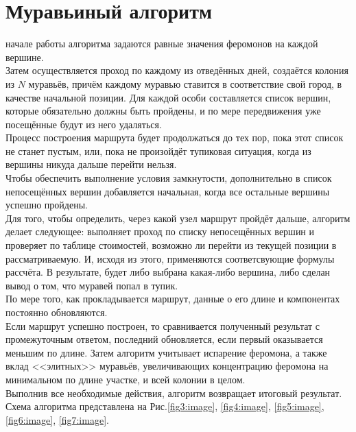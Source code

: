 \section{Муравьиный алгоритм}
 начале работы алгоритма задаются равные значения феромонов на каждой вершине.\\

Затем осуществляется проход по каждому из отведённых дней, создаётся колония из $N$ муравьёв, причём каждому муравью ставится в соответствие свой город, в качестве начальной позиции. Для каждой особи составляется список вершин, которые обязательно должны быть пройдены, и по мере передвижения уже посещённые будут из него удаляться. \\

Процесс построения маршрута будет продолжаться до тех пор, пока этот список не станет пустым, или, пока не произойдёт тупиковая ситуация, когда из вершины никуда дальше перейти нельзя.\\

Чтобы обеспечить выполнение условия замкнутости, дополнительно в список непосещённых вершин добавляется начальная, когда все остальные вершины успешно пройдены.\\

Для того, чтобы определить, через какой узел маршрут пройдёт дальше, алгоритм делает следующее: выполняет проход по списку непосещённых вершин и проверяет по таблице стоимостей, возможно ли перейти из текущей позиции в рассматриваемую. И, исходя из этого, применяются соответсвующие формулы рассчёта. В результате, будет либо выбрана какая-либо вершина, либо сделан вывод о том, что муравей попал в тупик. \\

По мере того, как прокладывается маршрут, данные о его длине и компонентах постоянно обновляются. \\

Если маршрут успешно построен, то сравнивается полученный результат с промежуточным ответом, последний обновляется, если первый оказывается меньшим по длине. Затем алгоритм учитывает испарение феромона, а также вклад <<элитных>> муравьёв, увеличивающих концентрацию феромона на минимальном по длине участке, и всей колонии в целом.\\

Выполнив все необходимые действия, алгоритм возвращает итоговый результат.\\

Схема алгоритма представлена на Рис.\ref{fig3:image}, \ref{fig4:image}, \ref{fig5:image}, \ref{fig6:image}, \ref{fig7:image}.

